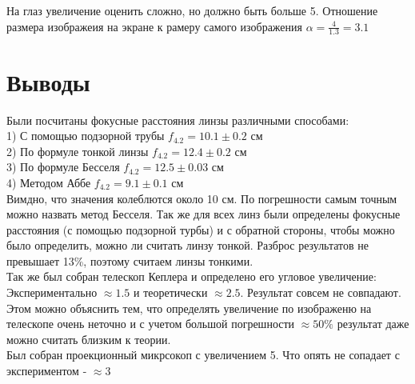 На глаз увеличение оценить сложно, но должно быть больше 5.
Отношение размера изображеия на экране к рамеру самого изображения $\alpha = \frac{4}{1.3} = 3.1$

\section*{Выводы}
\indent Были посчитаны фокусные расстояния линзы различными способами:\\
1) С помощью подзорной трубы $f_{4.2} = 10.1 \pm 0.2$ см\\
2) По формуле тонкой линзы $f_{4.2} = 12.4 \pm 0.2$ см\\
3) По формуле Бесселя $f_{4.2} = 12.5 \pm 0.03$ см\\
4) Методом Аббе $f_{4.2} = 9.1 \pm 0.1$ см\\

Вимдно, что значения колеблются около 10 см. По погрешности самым точным можно назвать метод Бесселя.
Так же для всех линз были определены фокусные расстояния (с помощью подзорной турбы) и с обратной стороны, чтобы можно было определить, можно ли считать линзу тонкой.
Разброс результатов не превышает 13\%, поэтому считаем линзы тонкими.\\
\indent Так же был собран телескоп Кеплера и определено его угловое увеличение: Экспериментально $\approx 1.5$ и теоретически $\approx 2.5$. Результат совсем не совпадают. Этом можно объяснить тем, что определять увеличение по изображеню на телескопе очень неточно и с учетом большой погрешности $\approx 50\%$ результат даже можно считать близким к теории.\\
\indent Был собран проекционный микрсокоп с увеличением 5. Что опять не сопадает с экспериментом - $\approx 3$\\



